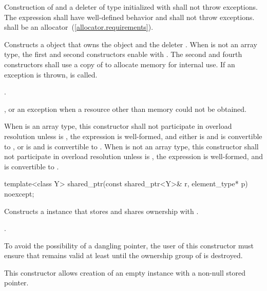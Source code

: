 \begin{itemdescr}
\pnum\requires Construction of  and a deleter of type 
initialized with  shall not throw exceptions.
The expression 
shall have well-defined behavior and shall not throw exceptions.
 shall be an allocator~(\ref{allocator.requirements}).

\pnum\effects  Constructs a  object that owns the
object  and the deleter .
When  is not an array type,
the first and second constructors enable  with .
The second and fourth constructors shall use a copy of  to
allocate memory for internal use.
If an exception is thrown,  is called.

\pnum\postconditions  {}.

\pnum\throws  {}, or an  exception
when a resource other than memory could not be obtained.

\pnum\remarks
When  is an array type,
this constructor shall not participate in overload resolution unless
 is ,
the expression  is well-formed, and either
 is  and  is convertible to , or
 is  and  is convertible to .
When  is not an array type,
this constructor shall not participate in overload resolution unless
 is ,
the expression  is well-formed, and
 is convertible to .
\end{itemdescr}

%
\begin{itemdecl}
template<class Y> shared_ptr(const shared_ptr<Y>& r, element_type* p) noexcept;
\end{itemdecl}

\begin{itemdescr}
\pnum
\effects Constructs a  instance that
stores  and shares ownership with .

\pnum
\postconditions {}.

\pnum
\begin{note} To avoid the possibility of a dangling pointer, the
user of this constructor must ensure that  remains valid at
least until the ownership group of  is destroyed. \end{note}

\pnum
\begin{note} This constructor allows creation of an empty
 instance with a non-null stored pointer. \end{note}
\end{itemdescr}

